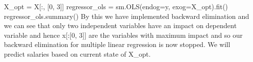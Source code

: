 \documentclass[11pt]{article}
\begin{document}
            X_opt = X[:, [0, 3]]
regressor_ols = sm.OLS(endog=y, exog=X_opt).fit()
regressor_ols.summary() By this we have implemented backward elimination and we can see that only two independent variables have an 
impact on dependent variable and hence x[:[0, 3]] are the variables with maximum impact and so our backward elimination for multiple 
linear regression is now stopped. We will predict salaries based on current state of X_opt.

    
    
    
    
\end{document}
